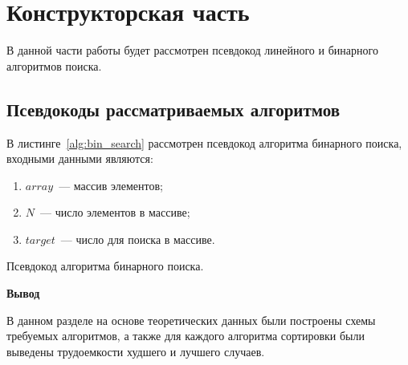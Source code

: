 \chapter{Конструкторская часть}
В данной части работы будет рассмотрен псевдокод линейного и бинарного алгоритмов поиска.





\section{Псевдокоды рассматриваемых алгоритмов}

В листинге~\ref{alg:bin_search} рассмотрен псевдокод алгоритма бинарного поиска, входными данными являются:
\begin{enumerate}
	\item $array$~--- массив элементов;
	\item $N$~--- число элементов в массиве;
	\item $target$~--- число для поиска в массиве.
\end{enumerate}

\begin{algorithm}
\caption{Псевдокод алгоритма бинарного поиска.}\label{alg:bin_search}
\begin{algorithmic}
			\State {}
		\EndIf
		\Else
		\EndIf
	\EndWhile
	\State {}
\end{algorithmic}
\end{algorithm}









\textbf{Вывод}

В данном разделе на основе теоретических данных были построены схемы
требуемых алгоритмов, а также для каждого алгоритма сортировки были выведены трудоемкости худшего и лучшего случаев.










